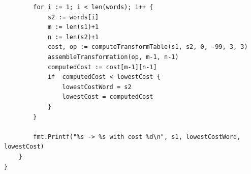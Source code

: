 \documentclass[12pt,letterpaper]{article}
\begin{document}
\begin{scriptsize}
\begin{verbatim}
        for i := 1; i < len(words); i++ {
            s2 := words[i]
            m := len(s1)+1
            n := len(s2)+1
            cost, op := computeTransformTable(s1, s2, 0, -99, 3, 3)
            assembleTransformation(op, m-1, n-1)
            computedCost := cost[m-1][n-1]
            if  computedCost < lowestCost {
                lowestCostWord = s2
                lowestCost = computedCost
            }
        }
    
        fmt.Printf("%s -> %s with cost %d\n", s1, lowestCostWord, lowestCost)
    }
}
        \end{verbatim}
    \end{scriptsize}
    
\end{document}
